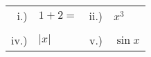 \documentclass{amsart}
\begin{document}
\begin{tabular}{r@{ }p{4.5cm}r@{ }l}
i.)&$1+2=$&ii.)&$x^{3}$\\\\
iv.)&$\vert x \vert$ &v.) &   $\sin{x}$
\end{tabular}
\end{document}
